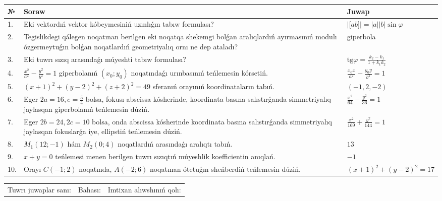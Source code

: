 \documentclass{article}
\begin{document}
\begin{tabular}{|m{0.7cm}|m{10cm}|m{4cm}|}
\hline
№ & Soraw & Juwap \\
\hline
1. & Eki vektordıń vektor kóbeymesiniń uzınlıǵın tabıw formulası? & $\left| \lbrack ab\rbrack \right|=|a||b|\sin\varphi$ \\
\hline
2. & Tegislikdegi qálegen noqatınan berilgen eki noqatqa shekemgi bolǵan aralıqlardıń ayırmasınıń modulı ózgermeytuǵın bolǵan noqatlardıń geometriyalıq ornı ne dep ataladı? & giperbola \\
\hline
3. & Eki tuwrı sızıq arasındaǵı múyeshti tabıw formulası? & $\text{tg}\varphi=\frac{k_2-k_1}{1+k_1k_2}$ \\
\hline
4. & $\frac{x^2}{a^2}-\frac{y^2}{b^2}=1$ giperbolanıń $(x_0;y_0)$ noqatındaǵı urınbasınıń teńlemesin kórsetiń. & $\frac{x_0x}{a^2}-\frac{y_0y}{b^2}=1$ \\
\hline
5. & $(x+1)^{2}+(y-2) ^{2}+(z+2) ^{2}=49$ sferanıń orayınıń koordinataların tabıń. & $(-1,2,-2)$ \\
\hline
6. & Eger $2a=16, e=\frac{5}{4}$ bolsa, fokusı abscissa kósherinde, koordinata basına salıstırǵanda simmetriyalıq jaylasqan giperbolanıń teńlemesin dúziń. & $\frac{x^{2}}{64}-\frac{y^{2}}{36}=1$ \\
\hline
7. & Eger $2b=24, 2 c=10$ bolsa, onda abscissa kósherinde koordinata basına salıstırǵanda simmetriyalıq jaylasqan fokuslarǵa iye, ellipstiń teńlemesin dúziń. & $\frac{x^{2}}{169}+\frac{y^{2}}{144}=1$ \\
\hline
8. & $M_{1} (12;-1)$ hám $M_{2} (0;4)$ noqatlardıń arasındaǵı aralıqtı tabıń. & $13$ \\
\hline
9. & $x+y=0$ teńlemesi menen berilgen tuwrı sızıqtıń múyeshlik koefficientin anıqlań. & $- 1$ \\
\hline
10. & Orayı $C (-1;2)$ noqatında, $A (-2;6 )$ noqatınan ótetuǵın sheńberdiń teńlemesin dúziń. & $(x+1)^{2}+(y-2)^{2}=17$ \\
\hline
\end{tabular}

\vspace{1cm}

\begin{tabular}{lll}
Tuwrı juwaplar sanı: \underline{\hspace{1.5cm}} & 
Bahası: \underline{\hspace{1.5cm}} & 
Imtixan alıwshınıń qolı: \underline{\hspace{2cm}} \\
\end{tabular}
\end{document}
